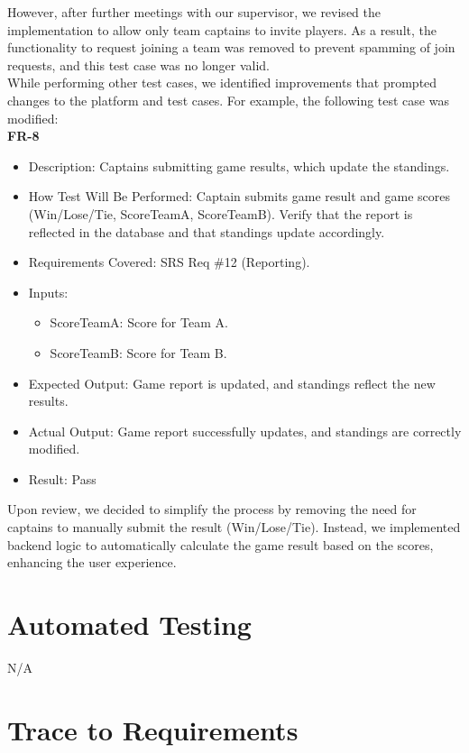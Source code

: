\documentclass[12pt, titlepage]{article}
\begin{document}
However, after further meetings with our supervisor, we revised the implementation to allow only team captains to invite players. As a result, the functionality to request joining a team was removed to prevent spamming of join requests, and this test case was no longer valid. \\


While performing other test cases, we identified improvements that prompted changes to the platform and test cases. For example, the following test case was modified:\\

 \textbf{FR-8}  
      \begin{itemize}
          \item Description: Captains submitting game results, which update the standings.
          \item How Test Will Be Performed: Captain submits game result and game scores (Win/Lose/Tie, ScoreTeamA, ScoreTeamB). Verify that the report is reflected in the database and that standings update accordingly.
          \item Requirements Covered: SRS Req \#12 (Reporting).
          \item Inputs:  
              \begin{itemize} 
                  \item ScoreTeamA: Score for Team A.  
                  \item ScoreTeamB: Score for Team B.  
              \end{itemize}
          \item Expected Output: Game report is updated, and standings reflect the new results.
          \item Actual Output: Game report successfully updates, and standings are correctly modified.
          \item Result: Pass
      \end{itemize}

Upon review, we decided to simplify the process by removing the need for captains to manually submit the result (Win/Lose/Tie). Instead, we implemented backend logic to automatically calculate the game result based on the scores, enhancing the user experience.

\section{Automated Testing}
N/A
		
\section{Trace to Requirements}
		
\end{document}
